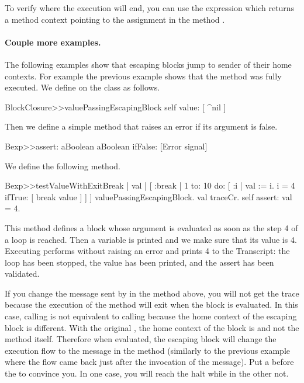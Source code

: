 \documentclass[a4paper,10pt,twoside]{book}
\begin{document}
To verify where the execution will end, you can use the expression  which returns a method context pointing to the assignment in the method .

\paragraph{Couple more examples.}
The following examples show that escaping blocks jump to sender of their home contexts. For example the previous example shows that the method  was fully executed.
We define  on the class  as follows.

\begin{code}{}
BlockClosure>>valuePassingEscapingBlock
	  self value: [ ^nil ]
\end{code}

Then we define a simple  method that raises an error if its argument is false.

\begin{code}{}
Bexp>>assert: aBoolean
	aBoolean ifFalse: [Error signal]
\end{code}

We define the following method.

\begin{code}{}
Bexp>>testValueWithExitBreak
	| val |
	[ :break |
	    1 to: 10 do: [ :i |
			         val := i.
			         i = 4 ifTrue: [ break value ] ] ] valuePassingEscapingBlock.
	val traceCr.
	self assert: val = 4.
\end{code}

This method defines a block whose argument  is evaluated as soon as the step 4 of a loop is reached. Then a variable  is printed and we make sure that its value is 4. Executing  performs without raising an error and prints 4 to the Transcript: the loop has been stopped, the value has been printed, and the assert has been validated.

If you change the  message sent by  in the  method above, you will not get the trace because the execution of the method  will exit when the block is evaluated. In this case, calling  is not equivalent to calling  because the home context of the escaping block \ct{[ ^ nil ]} is different.  With the original , the home context of the block \ct{[^ nil]}
is  and not the method  itself.
Therefore when evaluated, the escaping block will change the execution flow to the  message in the method  (similarly to the previous example where the flow came back just after the invocation of the  message). Put a  before the  to convince you. In one case, you will reach the halt while in the other not.
\end{document}
